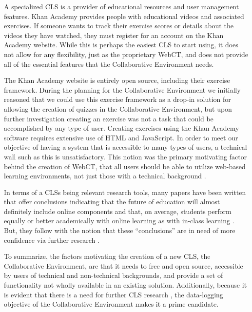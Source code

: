 A specialized CLS is a provider of educational resources and user management features. Khan Academy provides people with educational videos and associated exercises. If someone wants to track their exercise scores or details about the videos they have watched, they must register for an account on the Khan Academy website. While this is perhaps the easiest CLS to start using, it does not allow for any flexibility, just as the proprietary WebCT, and does not provide all of the essential features that the Collaborative Environment needs.

The Khan Academy website is entirely open source, including their exercise framework. During the planning for the Collaborative Environment we initially reasoned that we could use this exercise framework as a drop-in solution for allowing the creation of quizzes in the Collaborative Environment, but upon further investigation creating an exercise was not a task that could be accomplished by any type of user. Creating exercises using the Khan Academy software requires extensive use of HTML and JavaScript. In order to meet our objective of having a system that is accessible to many types of users, a technical wall such as this is unsatisfactory. This notion was the primary motivating factor behind the creation of WebCT, that all users should be able to utilize web-based learning environments, not just those with a technical background \cite{World Wide Web - Course tool}.

In terms of a CLSs being relevant research tools, many papers have been written that offer conclusions indicating that the future of education will almost definitely include online components \cite{keeping-pace2-pdf} and that, on average, students perform equally or better academically with online learning as with in-class learning \cite{National Primer on K-12 Online Learning.pdf}. But, they follow with the notion that these ``conclusions'' are in need of more confidence via further research \cite{National Primer on K-12 Online Learning.pdf}.

To summarize, the factors motivating the creation of a new CLS, the Collaborative Environment, are that it needs to free and open source, accessible by users of technical and non-technical backgrounds, and provide a set of functionality not wholly available in an existing solution. Additionally, because it is evident that there is a need for further CLS research \cite{National Primer on K-12 Online Learning.pdf, National Primer on K-12 Online Learning.pdf}, the data-logging objective of the Collaborative Environment makes it a prime candidate.

